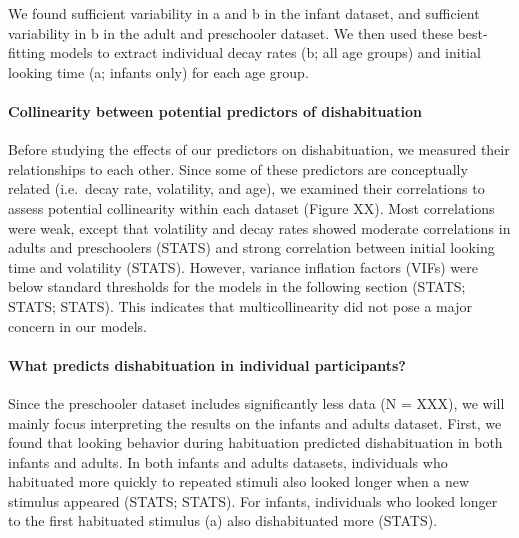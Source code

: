 \documentclass[10pt, letterpaper]{article}
\begin{document}
We found sufficient variability in a and b in the infant dataset, and
sufficient variability in b in the adult and preschooler dataset. We
then used these best-fitting models to extract individual decay rates
(b; all age groups) and initial looking time (a; infants only) for each
age group.

\hypertarget{collinearity-between-potential-predictors-of-dishabituation}{%
\paragraph{Collinearity between potential predictors of
dishabituation}\label{collinearity-between-potential-predictors-of-dishabituation}}

Before studying the effects of our predictors on dishabituation, we
measured their relationships to each other. Since some of these
predictors are conceptually related (i.e.~decay rate, volatility, and
age), we examined their correlations to assess potential collinearity
within each dataset (Figure XX). Most correlations were weak, except
that volatility and decay rates showed moderate correlations in adults
and preschoolers (STATS) and strong correlation between initial looking
time and volatility (STATS). However, variance inflation factors (VIFs)
were below standard thresholds for the models in the following section
(STATS; STATS; STATS). This indicates that multicollinearity did not
pose a major concern in our models.

\hypertarget{what-predicts-dishabituation-in-individual-participants}{%
\paragraph{What predicts dishabituation in individual
participants?}\label{what-predicts-dishabituation-in-individual-participants}}

Since the preschooler dataset includes significantly less data (N =
XXX), we will mainly focus interpreting the results on the infants and
adults dataset. First, we found that looking behavior during habituation
predicted dishabituation in both infants and adults. In both infants and
adults datasets, individuals who habituated more quickly to repeated
stimuli also looked longer when a new stimulus appeared (STATS; STATS).
For infants, individuals who looked longer to the first habituated
stimulus (a) also dishabituated more (STATS).
\end{document}
